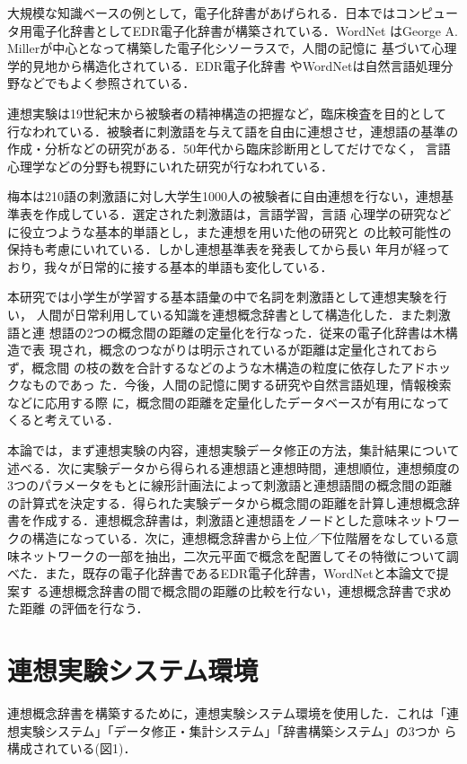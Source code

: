 大規模な知識ベースの例として，電子化辞書があげられる．日本ではコンピュー
タ用電子化辞書としてEDR電子化辞書が構築されている\cite{Edr1990}．WordNet
はGeorge A. Millerが中心となって構築した電子化シソーラスで，人間の記憶に
基づいて心理学的見地から構造化されている\cite{Miller1993}．EDR電子化辞書
やWordNetは自然言語処理分野などでもよく参照されている．

連想実験は19世紀末から被験者の精神構造の把握など，臨床検査を目的として
行なわれている．被験者に刺激語を与えて語を自由に連想させ，連想語の基準の
作成・分析などの研究がある．50年代から臨床診断用としてだけでなく，
言語心理学などの分野も視野にいれた研究が行なわれている．

梅本は210語の刺激語に対し大学生1000人の被験者に自由連想を行ない，連想基
準表を作成している\cite{Umemoto1969}．選定された刺激語は，言語学習，言語
心理学の研究などに役立つような基本的単語とし，また連想を用いた他の研究と
の比較可能性の保持も考慮にいれている．しかし連想基準表を発表してから長い
年月が経っており，我々が日常的に接する基本的単語も変化している．

本研究では小学生が学習する基本語彙の中で名詞を刺激語として連想実験を行い，
人間が日常利用している知識を連想概念辞書として構造化した．また刺激語と連
想語の2つの概念間の距離の定量化を行なった．従来の電子化辞書は木構造で表
現され，概念のつながりは明示されているが距離は定量化されておらず，概念間
の枝の数を合計するなどのような木構造の粒度に依存したアドホックなものであっ
た．今後，人間の記憶に関する研究や自然言語処理，情報検索などに応用する際
に，概念間の距離を定量化したデータベースが有用になってくると考えている．

本論では，まず連想実験の内容，連想実験データ修正の方法，集計結果について
述べる．次に実験データから得られる連想語と連想時間，連想順位，連想頻度の
3つのパラメータをもとに線形計画法によって刺激語と連想語間の概念間の距離
の計算式を決定する．得られた実験データから概念間の距離を計算し連想概念辞
書を作成する．連想概念辞書は，刺激語と連想語をノードとした意味ネットワー
クの構造になっている．次に，連想概念辞書から上位／下位階層をなしている意
味ネットワークの一部を抽出，二次元平面で概念を配置してその特徴について調
べた．また，既存の電子化辞書であるEDR電子化辞書，WordNetと本論文で提案す
る連想概念辞書の間で概念間の距離の比較を行ない，連想概念辞書で求めた距離
の評価を行なう．

\section{連想実験システム環境}

連想概念辞書を構築するために，連想実験システム環境を使用した．これは「連
想実験システム」「データ修正・集計システム」「辞書構築システム」の3つか
ら構成されている(図1)．

